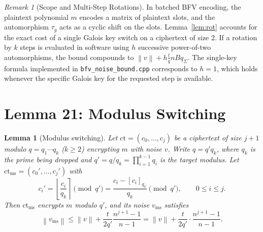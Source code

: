 \documentclass[11pt]{article}
\newtheorem{lemma}{Lemma}
\theoremstyle{definition}
\theoremstyle{remark}
\newtheorem{remark}{Remark}
\newcommand{\norm}[1]{\left\lVert #1\right\rVert}
\newcommand{\ct}{\mathrm{ct}}
\newcommand{\ctms}{\mathrm{ct}_{\mathrm{ms}}}
\newcommand{\vms}{v_{\mathrm{ms}}}
\newcommand{\Sgeo}[1]{\frac{n^{#1+1}-1}{n-1}}
\begin{document}
\begin{remark}[Scope and Multi-Step Rotations]
In batched BFV encoding, the plaintext polynomial $m$ encodes a matrix of plaintext slots, and the automorphism $\tau_g$ acts as a cyclic shift on the slots.
Lemma~\ref{lem:rot} accounts for the exact cost of a single Galois key switch on a ciphertext of size 2.
If a rotation by $k$ steps is evaluated in software using $h$ successive power-of-two automorphisms, the bound compounds to $\norm{v} + h \frac{t}{q} n B q_\Sigma$.
The single-key formula implemented in \texttt{bfv\_noise\_bound.cpp} corresponds to $h=1$, which holds whenever the specific Galois key for the requested step is available.
\end{remark}

\section*{Lemma 21: Modulus Switching}

\begin{lemma}[Modulus switching]\label{lem:modsw}
Let $\ct = (c_0, \dots, c_j)$ be a ciphertext of size $j+1$ modulo $q = q_1 \cdots q_k$ ($k \geq 2$) encrypting $m$ with noise $v$.
Write $q = q' q_k$, where $q_k$ is the prime being dropped and $q' = q/q_k = \prod_{i=1}^{k-1} q_i$ is the target modulus.
Let $\ctms = (c_0', \dots, c_j')$ with
\[
  c_i' = \left\lfloor \frac{c_i}{q_k} \right\rceil \pmod{q'} = \frac{c_i - [c_i]_{q_k}}{q_k} \pmod{q'}, \qquad 0 \leq i \leq j.
\]
Then $\ctms$ encrypts $m$ modulo $q'$, and its noise $\vms$ satisfies
\[
  \norm{\vms} \leq \norm{v} + \frac{t}{2q'}\Sgeo{j} = \norm{v} + \frac{t}{2q'}\cdot\frac{n^{j+1}-1}{n-1}.
\]
\end{lemma}
\end{document}

